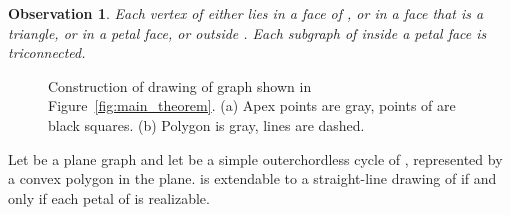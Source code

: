 \documentclass{llncs}
\newtheorem{obs}{Observation}
\begin{document}
\begin{obs}
\label{obs:G_structure}
Each vertex of  either lies in a face of , or in a face that is a triangle, or in a petal face, or outside . Each subgraph of  inside a petal face is triconnected.
\end{obs}

\begin{figure}[t]
 \centering
 \hspace{+1cm}
 \caption{Construction of drawing of graph  shown in Figure~\ref{fig:main_theorem}. (a) Apex points are gray, points of  are black squares. (b) Polygon  is gray, lines  are dashed.}
\end{figure}

\vspace{-0.5cm}
\begin{theorem}
\label{theorem:convex} Let  be a plane graph and let  be
a simple outerchordless cycle of , represented by a convex polygon  in the plane. 
 is extendable to a straight-line drawing of  if and only if each petal of  is realizable.
\end{theorem}
\end{document}
